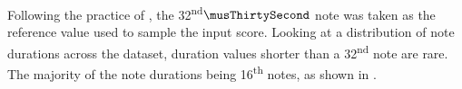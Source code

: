 
Following the practice of \textcite{micchi2020not}, the
32\textsuperscript{nd}$\musThirtySecond$ note was taken as
the reference value used to sample the input score. Looking
at a distribution of note durations across the dataset,
duration values shorter than a 32\textsuperscript{nd} note
are rare. The majority of the note durations being
16\textsuperscript{th} notes, as shown in
.

